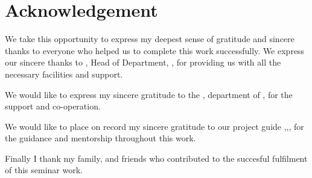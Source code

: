 \chapter*{Acknowledgement}%
%



\par We take this opportunity to express my deepest sense of gratitude and sincere thanks to everyone who helped us to complete this work successfully. We express our sincere thanks to \hod, Head of Department, \dept, \college\hspace*{2pt} for providing  us with all the necessary facilities and support.\par

We would like to express my sincere gratitude to the \projcordinatorA, \hspace*{2pt} department of \hspace*{2pt} \dept, \hspace*{2pt} \college \hspace*{2pt} \collegeplace \hspace*{2pt} for the support and co-operation.

We would like to place on record my sincere gratitude to our project guide \facultyA,\hspace*{2pt}\facultyAdes,\hspace*{2pt}\dept,\hspace*{2pt}\college \hspace*{2pt} %
for the guidance and mentorship throughout this work.

Finally I thank my family, and friends who contributed to the succesful fulfilment of this seminar work.

\vspace*{30pt}
\begin{flushright}
	\textbf{\studentA}\\
	\textbf{\studentB}\\

\end{flushright}
\thispagestyle{plain}
